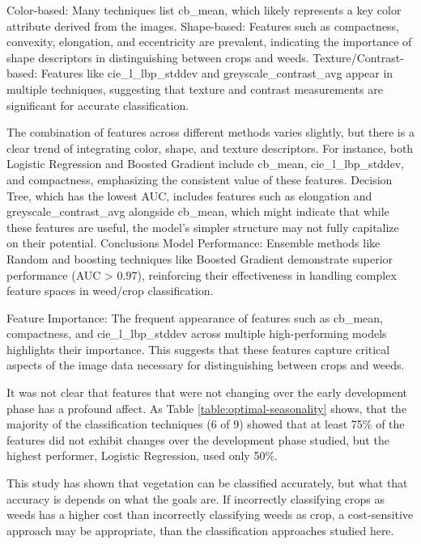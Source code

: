 \documentclass[letterpaper]{report}
\begin{document}
Color-based: Many techniques list cb\_mean, which likely represents a key color attribute derived from the images.
Shape-based: Features such as compactness, convexity, elongation, and eccentricity are prevalent, indicating the importance of shape descriptors in distinguishing between crops and weeds.
Texture/Contrast-based: Features like cie\_l\_lbp\_stddev and greyscale\_contrast\_avg appear in multiple techniques, suggesting that texture and contrast measurements are significant for accurate classification.

The combination of features across different methods varies slightly, but there is a clear trend of integrating color, shape, and texture descriptors. For instance, both Logistic Regression and Boosted Gradient include cb\_mean, cie\_l\_lbp\_stddev, and compactness, emphasizing the consistent value of these features.
Decision Tree, which has the lowest AUC, includes features such as elongation and greyscale\_contrast\_avg alongside cb\_mean, which might indicate that while these features are useful, the model’s simpler structure may not fully capitalize on their potential.
Conclusions
Model Performance:
Ensemble methods like Random  and boosting techniques like Boosted Gradient demonstrate superior performance (AUC > 0.97), reinforcing their effectiveness in handling complex feature spaces in weed/crop classification.

Feature Importance:
The frequent appearance of features such as cb\_mean, compactness, and cie\_l\_lbp\_stddev across multiple high-performing models highlights their importance. This suggests that these features capture critical aspects of the image data necessary for distinguishing between crops and weeds.

It was not clear that features that were not changing over the early development phase has a profound affect. As Table \ref{table:optimal-seasonality} shows, that the majority of the classification techniques (6 of 9) showed that at least 75\% of the features did not exhibit changes over the development phase studied, but the highest performer, Logistic Regression, used only 50\%.

This study has shown that vegetation can be classified accurately, but what that accuracy is depends on what the goals are. If incorrectly classifying crops as weeds has a higher cost than incorrectly classifying weeds as crop, a cost-sensitive approach may be appropriate, than the classification approaches studied here. 
\end{document}
